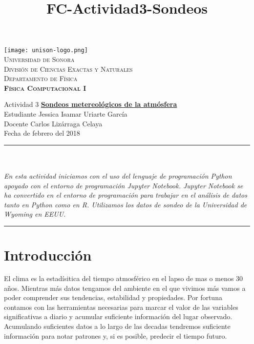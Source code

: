 \documentclass[12pt]{article}
\title{FC-Actividad3-Sondeos}
\begin{document}

\begin{center}


\texttt{[image: unison-logo.png]}~\\[0.8cm]

\textsc{\LARGE Universidad de Sonora}\\[0.1cm]
\textsc{Divisi\'on de Ciencias Exactas y Naturales}\\[0.1cm]
\textsc{Departamento de F\'isica \\[0.5cm] \textbf{F\'isica Computacional I}}\\%

\end{center}
\noindent
Actividad 3 \dotfill \textbf{\underline{Sondeos metereol\'ogicos de la atm\'osfera}}\\
Estudiante \dotfill Jessica Isamar Uriarte Garc\'ia \\
Docente \dotfill Carlos Liz\'arraga Celaya \\
Fecha  de febrero del 2018 \\
\rule{\linewidth}{0.5pt} \\[6pt] 
\abstractname{\\ \emph{ \scriptsize{  \baselinestretch En esta actividad iniciamos con el uso del lenguaje de programación Python apoyado con el entorno de programación Jupyter Notebook. Jupyter Notebook se ha convertido en el entorno de programación para trabajar en el análisis de datos tanto en Python como en R. Utilizamos los datos de sondeo de la Universidad de Wyoming en EEUU.\\} }}
\renewcommand{\baselinestretch}{0.6}
\rule{\linewidth}{2pt}  
\small\tableofcontents

\newpage

\section{Introducci\'on}
\noindent 
El clima es la estad\'isitica del tiempo atmosf\'erico en el lapso de mas o menos 30 años. Mientras m\'as datos tengamos del ambiente en el que vivimos m\'as vamos a poder comprender sus tendencias, estabilidad y propiedades. Por fortuna contamos con las herramientas necesarias para marcar el valor de las variables significativas a diario y acumular suficiente informaci\'on del lugar observado. Acumulando suficientes datos a lo largo de las decadas tendremos suficiente informaci\'on para notar patrones y, si es posible, predecir el tiempo futuro. 
\end{document}

